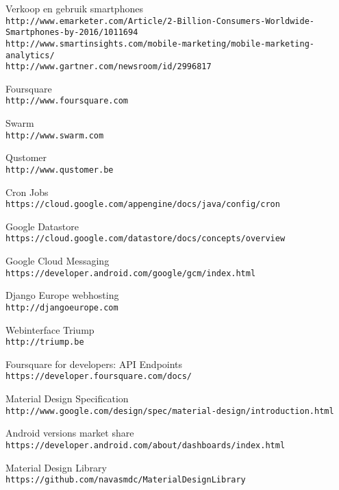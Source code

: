 \begin{thebibliography}{9}

Verkoop en gebruik smartphones
\\\texttt{http://www.emarketer.com/Article/2-Billion-Consumers-Worldwide-Smartphones-by-2016/1011694}
\\\texttt{http://www.smartinsights.com/mobile-marketing/mobile-marketing-analytics/}
\\\texttt{http://www.gartner.com/newsroom/id/2996817}

Foursquare
\\\texttt{http://www.foursquare.com}

Swarm
\\\texttt{http://www.swarm.com}

Qustomer
\\\texttt{http://www.qustomer.be}

Cron Jobs
\\\texttt{https://cloud.google.com/appengine/docs/java/config/cron}

Google Datastore
\\\texttt{https://cloud.google.com/datastore/docs/concepts/overview}

Google Cloud Messaging
\\\texttt{https://developer.android.com/google/gcm/index.html}

Django Europe webhosting
\\\texttt{http://djangoeurope.com}

Webinterface Triump
\\\texttt{http://triump.be}

Foursquare for developers: API Endpoints
\\\texttt{https://developer.foursquare.com/docs/}

Material Design Specification
\\\texttt{http://www.google.com/design/spec/material-design/introduction.html}

Android versions market share
\\\texttt{https://developer.android.com/about/dashboards/index.html}

Material Design Library
\\\texttt{https://github.com/navasmdc/MaterialDesignLibrary}


\end{thebibliography}
